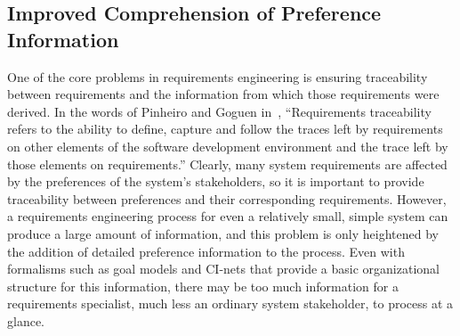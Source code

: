 


\subsection{Improved Comprehension of Preference Information}
\label{sec:pref-usability}

One of the core problems in requirements engineering is ensuring traceability between requirements and the information from which those requirements were derived. In the words of Pinheiro and Goguen in~\cite{Pinheiro:IEEESoftware96}, ``Requirements traceability refers to the ability to define, capture and follow the traces left by requirements on other elements of the software development environment and the trace left by those elements on requirements.'' Clearly, many system requirements are affected by the preferences of the system's stakeholders, so it is important to provide traceability between preferences and their corresponding requirements.
However, a requirements engineering process for even a relatively small, simple system can produce a large amount of information, and this problem is only heightened by the addition of detailed preference information to the process. Even with formalisms such as goal models and CI-nets that provide a basic organizational structure for this information, there may be too much information for a requirements specialist, much less an ordinary system stakeholder, to process at a glance. 

